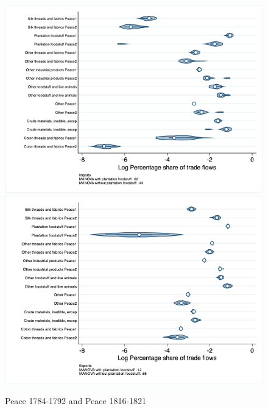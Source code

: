 \documentclass[12pt,a4paper,notitlepage,english]{article}
\begin{document}
\begin{appendix}
\begin{figure}[h!]
\centering
\caption{Peace 1784-1792 and Peace 1816-1821}
\label{peace1784_1792_peace1816_1840_nat_distr_Iaggr}
\includegraphics[scale=.4]{peace1784_1792_peace1816_1840_nat_distr_Iaggr}
\includegraphics[scale=.4]{peace1784_1792_peace1816_1840_nat_distr_Xaggr}
\end{figure}



\end{appendix}
\end{document}
